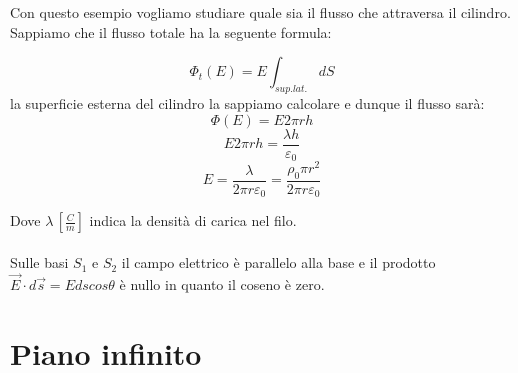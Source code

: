 Con questo esempio vogliamo studiare quale sia il flusso che attraversa il cilindro.
Sappiamo che il flusso totale ha la seguente formula:

\begin{equation*}
    \Phi_t(E) = E\int_{sup. lat.}dS
\end{equation*}
la superficie esterna del cilindro la sappiamo calcolare e dunque il flusso sarà:
\begin{equation*}
    \Phi(E) = E2\pi rh
\end{equation*}
\begin{equation*}
    E2\pi rh = \frac{\lambda h}{\varepsilon_0}
\end{equation*}
\begin{equation}
    E = \frac{\lambda}{2\pi r\varepsilon_0}  = \frac{\rho_{0}\pi r^2}{2\pi r\varepsilon_0}
    \label{leggeDiGaussDim}
\end{equation}

Dove $\lambda\,[\frac{C}{m}]$ indica la densità di carica nel filo.
\paragraph{}
Sulle basi $S_1$ e $S_2$ il campo elettrico è parallelo alla base e il prodotto \\$\vec{E}\cdot d\vec{s} = Edscos\theta$ è nullo in quanto il coseno è zero.
 
\section{Piano infinito}
\label{pianoInfinito}

